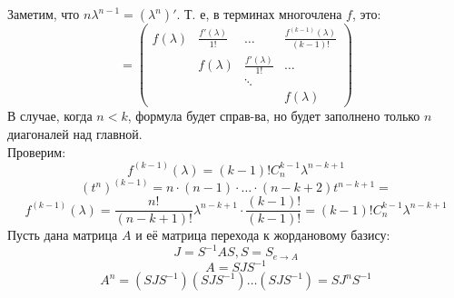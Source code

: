 Заметим, что $n \lambda^{n - 1} = (\lambda^{n})'$. Т. е, в терминах многочлена $f$, это:
\[
    = \begin{pmatrix} f(\lambda) & \frac{f'(\lambda)}{1!} & \ldots & \frac{f^{(k - 1)}(\lambda)}{(k - 1)!} \\ & f(\lambda) & \frac{f'(\lambda)}{1!} & \ldots \\ & & \ddots \\ & & & f(\lambda)\end{pmatrix}
\]
В случае, когда $n < k$, формула будет справ-ва, но будет заполнено только $n$ диагоналей над главной. \\
Проверим:
\[
    f^{(k - 1)}(\lambda) = (k - 1)! C_{n}^{k - 1} \lambda^{n - k + 1}
\]
\[
    (t^{n})^{(k - 1)} = n \cdot (n - 1) \cdot \ldots \cdot (n - k + 2) t^{n - k + 1} = 
\]
\[
    f^{(k - 1)}(\lambda) = \frac{n!}{(n - k + 1)!} \lambda^{n - k + 1} \cdot \frac{(k - 1)!}{(k - 1)!} = (k - 1)! C_{n}^{k - 1} \lambda^{n - k + 1}
\]
Пусть дана матрица $A$ и её матрица перехода к жордановому базису:
\[
    J = S^{-1}A S, S = S_{e \rightarrow A}
\]
\[
    A = SJS^{-1}
\]
\[
    A^{n} = (SJS^{-1})(SJS^{-1}) \ldots (SJS^{-1}) = SJ^{n}S^{-1}
\]
